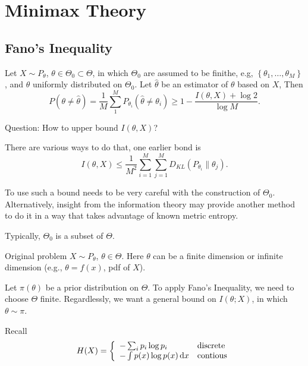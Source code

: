 \chapter{Minimax Theory}

\section{Fano's Inequality}

Let \(X\sim P_{\theta}\), \(\theta\in\Theta_{0}\subset\Theta\), in which \(\Theta_{0}\) are assumed to be finithe, e.g, \(\left\{\theta_{1},\ldots,\theta_{M}\right\}\), and \(\theta\) uniformly distributed on \(\Theta_{0}\). Let \(\hat{\theta}\) be an estimator of \(\theta\) based on \(X\), Then
\begin{equation}
	P\left(\theta\neq\hat{\theta}\right)=\frac{1}{M}\sum_{1}^{M}P_{\theta_{i}}\left(\hat{\theta}\neq\theta_{i}\right)\geq 1-\frac{I\left(\theta,X\right)+\log 2}{\log M}.
\end{equation}

Question: How to upper bound \(I\left(\theta, X\right)\)?

There are various ways to do that, one earlier bond is
\begin{equation}
	I\left(\theta,X\right)\leq\frac{1}{M^{2}}\sum_{i=1}^{M}\sum_{j=1}^{M}D_{KL}\left(P_{\theta_{i}}\|\theta_{j}\right).
\end{equation}

To use such a bound needs to be very careful with the construction of \(\Theta_{0}\). Alternatively, insight from the information theory may provide another method to do it in a way that takes advantage of known metric entropy.

Typically, \(\Theta_{0}\) is a subset of \(\Theta\).

Original problem \(X\sim P_{\theta}\), \(\theta\in\Theta\). Here \(\theta\) can be a finite dimension or infinite dimension (e.g., \(\theta=f(x)\), pdf of \(X\)).

Let \(\pi(\theta)\) be a prior distribution on \(\Theta\). To apply Fano's Inequality, we need to choose \(\Theta\) finite. Regardlessly, we want a general bound on \(I\left(\theta; X\right)\), in which \(\theta\sim\pi\).

Recall
\begin{equation}
	H(X)=\left\{\begin{array}{ll}
		-\sum_{i}p_{i}\log p_{i}  & \text{discrete} \\
		-\int p(x)\log p(x)\mathop{}\!\mathrm{d} x & \text{contious}
	\end{array}\right.
\end{equation}

